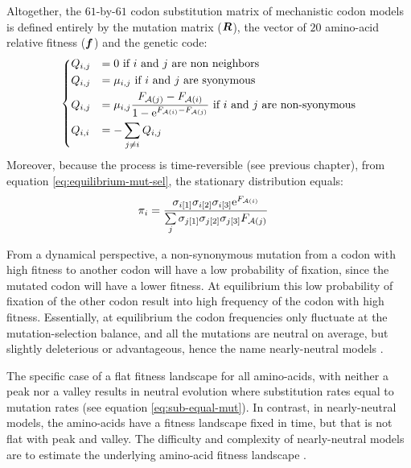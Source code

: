 Altogether, the $61$-by-$61$ \gls{codon} \gls{substitution} matrix of mechanistic \gls{codon} models is defined entirely by the mutation matrix ($\bm{R}$), the vector of $20$ amino-acid relative fitness ($\bm{f}$) and the genetic code:
\begin{equation}
\begin{dcases}
Q_{{i}, {j}} & = 0 \text{ if ${i}$ and ${j}$ are non neighbors} \\
Q_{{i}, {j}} & = \mu_{{i}, {j}} \text{ if ${i}$ and ${j}$ are syonymous} \\
Q_{{i}, {j}} & = \mu_{{i}, {j}} \dfrac{F_{\mathcal{A}({j})} - F_{\mathcal{A}({i})}}{1 - \mathrm{e}^{F_{\mathcal{A}({i})} - F_{\mathcal{A}({j})}} } \text{ if ${i}$ and ${j}$ are non-syonymous} \\
Q_{{i}, {i}} & = - \sum\limits_{{j} \neq {i}} Q_{{i}, {j}}
\end{dcases}
\label{eq:propensities-models}
\end{equation}
Moreover, because the process is time-reversible (see previous chapter), from equation \ref{eq:equilibrium-mut-sel}, the stationary distribution equals:
\begin{align}
\pi_{{i}} & = \dfrac{\sigma_{{i}[1]}\sigma_{{i}[2]}\sigma_{{i}[3]}\mathrm{e}^{F_{\mathcal{A}({i})}}}{\sum\limits_{{j}}\sigma_{{j}[1]}\sigma_{{j}[2]}\sigma_{{j}[3]}F_{\mathcal{A}({j})} }
\end{align}

From a dynamical perspective, a non-synonymous mutation from a \gls{codon} with high fitness to another \gls{codon} will have a low probability of fixation, since the mutated \gls{codon} will have a lower fitness.
At equilibrium this low probability of fixation of the other \gls{codon} result into high frequency of the \gls{codon} with high fitness.
Essentially, at equilibrium the \gls{codon} frequencies only fluctuate at the mutation-selection balance, and all the mutations are \gls{neutral} on average, but slightly deleterious or advantageous, hence the name \gls{nearly-neutral} models \citep{Ohta1973, Ohta1992, Rodrigue2016}.

The specific case of a flat fitness landscape for all amino-acids, with neither a peak nor a valley results in \gls{neutral} evolution where \gls{substitution} rates equal to mutation rates (see equation \ref{eq:sub-equal-mut}).
In contrast, in \gls{nearly-neutral} models, the amino-acids have a fitness landscape fixed in time, but that is not flat with peak and valley.
The difficulty and complexity of \gls{nearly-neutral} models are to estimate the underlying amino-acid fitness landscape \citep{Halpern1998}.

